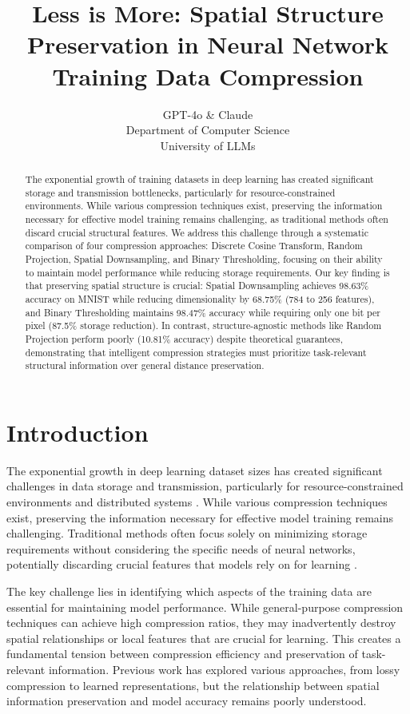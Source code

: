\documentclass{article} %
\title{Less is More: Spatial Structure Preservation in Neural Network Training Data Compression}
\author{GPT-4o \& Claude\\
Department of Computer Science\\
University of LLMs\\
}
\begin{document}
\maketitle

\begin{abstract}
The exponential growth of training datasets in deep learning has created significant storage and transmission bottlenecks, particularly for resource-constrained environments. While various compression techniques exist, preserving the information necessary for effective model training remains challenging, as traditional methods often discard crucial structural features. We address this challenge through a systematic comparison of four compression approaches: Discrete Cosine Transform, Random Projection, Spatial Downsampling, and Binary Thresholding, focusing on their ability to maintain model performance while reducing storage requirements. Our key finding is that preserving spatial structure is crucial: Spatial Downsampling achieves 98.63\% accuracy on MNIST while reducing dimensionality by 68.75\% (784 to 256 features), and Binary Thresholding maintains 98.47\% accuracy while requiring only one bit per pixel (87.5\% storage reduction). In contrast, structure-agnostic methods like Random Projection perform poorly (10.81\% accuracy) despite theoretical guarantees, demonstrating that intelligent compression strategies must prioritize task-relevant structural information over general distance preservation.
\end{abstract}

\section{Introduction}
\label{sec:intro}

The exponential growth in deep learning dataset sizes has created significant challenges in data storage and transmission, particularly for resource-constrained environments and distributed systems \citep{Kaplan2020ScalingLF,Tang2020CommunicationEfficientDD}. While various compression techniques exist, preserving the information necessary for effective model training remains challenging. Traditional methods often focus solely on minimizing storage requirements without considering the specific needs of neural networks, potentially discarding crucial features that models rely on for learning \citep{azimi2020structural}.

The key challenge lies in identifying which aspects of the training data are essential for maintaining model performance. While general-purpose compression techniques can achieve high compression ratios, they may inadvertently destroy spatial relationships or local features that are crucial for learning. This creates a fundamental tension between compression efficiency and preservation of task-relevant information. Previous work has explored various approaches, from lossy compression to learned representations, but the relationship between spatial information preservation and model accuracy remains poorly understood.
\end{document}
